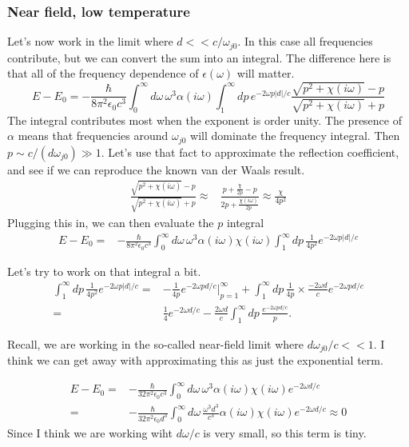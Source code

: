 \subsubsection{Near field, low temperature}
Let's now work in the limit where $d<<c/\omega_{j0}$.
  In this case all frequencies contribute, but we can convert the sum into an integral.
  The difference here is that all of the frequency dependence of $\epsilon(\omega)$  will matter.  
\begin{equation}
E-E_0=-\frac{\hbar}{8\pi^2\epsilon_0c^3}\int_0^\infty d\omega\,\omega^3\alpha(i\omega)
\int_1^\infty dp\,e^{-2\omega p|d|/c}\frac{\sqrt{p^2+\chi(i\omega)}-p}{\sqrt{p^2+\chi(i\omega)}+p}
\end{equation}
The integral contributes most when the exponent is order unity.
  The presence of $\alpha$ means that frequencies around $\omega_{j0}$ will dominate the frequency integral.
  Then $p \sim  c/(d\omega_{j0})\gg 1$.
  Let's use that fact to approximate the reflection coefficient, 
and see if we can reproduce the known van der Waals result.  
\begin{align}
  \frac{\sqrt{p^2+\chi(i\omega)}-p}{\sqrt{p^2+\chi(i\omega)}+p}\approx 
& \frac{ p + \frac{\chi}{2p}-p}{2p+\frac{\chi(i\omega)}{2p}} \approx \frac{\chi}{4p^2} 
\end{align}
Plugging this in, we can then evaluate the $p$ integral
\begin{align}
E-E_0=&-\frac{\hbar}{8\pi^2\epsilon_0c^3}\int_0^\infty d\omega\,\omega^3\alpha(i\omega)\chi(i\omega)
\int_1^\infty dp\,\frac{1}{4p^2}e^{-2\omega p|d|/c}
\end{align}

Let's try to work on that integral a bit.  
\begin{align}
\int_1^\infty dp\,\frac{1}{4p^2}e^{-2\omega p|d|/c} =& -\frac{1}{4p}e^{-2\omega p d/c}\bigg|_{p=1}^{\infty}
 + \int_1^\infty dp\, \frac{1}{4p}\times \frac{-2\omega d}{c}e^{-2\omega pd/c}\\
=& \frac{1}{4}e^{-2\omega d/c} - \frac{2\omega d}{c} \int_1^\infty dp\, \frac{e^{-2\omega pd/c}}{p}.
\end{align}

Recall, we are working in the so-called near-field limit where $d\omega_{j0}/c<<1.$  
I think we can get away with approximating this as just the exponential term.  

\begin{align}
E-E_0=&-\frac{\hbar}{32\pi^2\epsilon_0c^3}\int_0^\infty d\omega\,\omega^3\alpha(i\omega)\chi(i\omega)e^{-2\omega d/c}\\
=&-\frac{\hbar}{32\pi^2\epsilon_0 d^3}\int_0^\infty d\omega\,\frac{\omega^3d^3}{c^3}\alpha(i\omega)\chi(i\omega)e^{-2\omega d/c}\approx 0
\end{align}
Since I think we are working wiht $d\omega/c$ is very small, so this term is tiny.  

